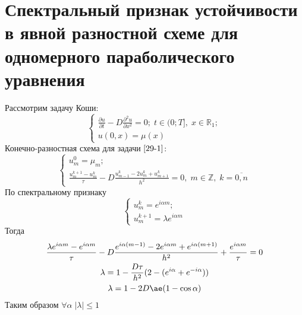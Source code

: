 \documentclass[__main__.tex]{subfiles}
\begin{document}
\section{Спектральный признак устойчивости в явной разностной схеме для одномерного параболического уравнения}

Рассмотрим задачу Коши:
\begin{equation}
	\begin{cases}
	\frac{\partial u}{\partial t} - D \frac{\partial^2 u}{\partial x^2} = 0; \; t \in (0;T], \; x \in \mathbb{R}_1;\\
	u(0, x) = \mu(x)
	\end{cases}
	\label{29-1}
\end{equation}
Конечно-разностная схема для задачи $\ref{29-1}$:
\begin{equation*}
	\begin{cases}
	u^0_m = \mu_m;\\
	\frac{u^{k+1}_m - u^k_m}{\tau} - D\frac{u^k_{m-1} - 2u^k_m + u^k_{m+1}}{h^2} = 0, \; m \in \mathbb{Z}, \; k = \overline{0, n}
	\end{cases}
\end{equation*}
По спектральному признаку 
\begin{equation*}
	\begin{cases}
	u^k_m = e^{i \alpha m};\\
	u^{k+1}_m = \lambda e^{i \alpha m}
	\end{cases}
\end{equation*}
Тогда
\begin{gather*}
\frac{\lambda e^{i \alpha m} - e^{i \alpha m}}{\tau} - D \frac{e^{i \alpha (m-1)} - 2e^{i \alpha m} + e^{i \alpha (m+1)}}{h^2} + \frac{e^{i \alpha m}}{\tau} = 0\\
\lambda = 1 - \frac{D\tau}{h^2}(2 - (e^{i \alpha} + e^{-i \alpha}))\\
\lambda = 1 - 2D\ae(1 - \cos{\alpha})
\end{gather*}
Таким образом $\forall \alpha \; |\lambda| \le 1$
\end{document}
